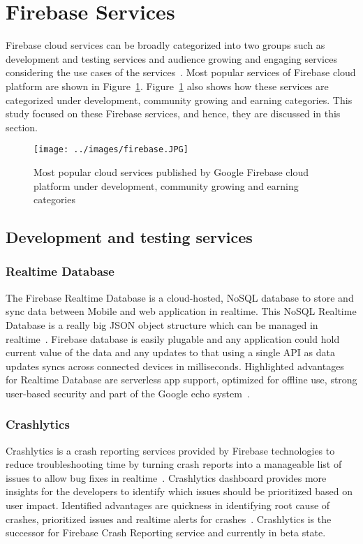 \section{Firebase Services}

Firebase cloud services can be broadly categorized into two groups
such as development and testing services and audience growing and
engaging services considering the use cases of the
services~\cite{hid-sp18-409-www-firebase-products}. Most popular
services of Firebase cloud platform are shown in
Figure~\ref{fig:firebase}. Figure~\ref{fig:firebase} also shows how
these services are categorized under development, community growing
and earning categories. This study focused on these Firebase services,
and hence, they are discussed in this section.

\begin{figure}[htb]
	\centering\texttt{[image: ../images/firebase.JPG]}
        \caption{
	Most popular cloud services published by Google Firebase cloud
	platform under development, community growing and earning
	categories~\cite{hid-sp18-409-www-firebase}}\label{fig:firebase}
\end{figure}

\subsection{Development and testing services}

\subsubsection{Realtime Database} The Firebase Realtime Database is a
cloud-hosted, NoSQL database to store and sync data between Mobile and
web application in realtime. This NoSQL Realtime Database is a really
big JSON object structure which can be managed in
realtime~\cite{hid-sp18-409-www-firebase-wikipedia,
  hid-sp18-409-www-firebase-products}. Firebase database is easily
plugable and any application could hold current value of the data and
any updates to that using a single API as data updates syncs across
connected devices in milliseconds. Highlighted advantages for Realtime
Database are serverless app support, optimized for offline use, strong
user-based security and part of the Google echo
system~\cite{hid-sp18-409-www-firebase-products}.

\subsubsection{Crashlytics} Crashlytics is a crash reporting services
provided by Firebase technologies to reduce troubleshooting time by
turning crash reports into a manageable list of issues to allow bug
fixes in
realtime~\cite{hid-sp18-409-www-firebase-products}. Crashlytics
dashboard provides more insights for the developers to identify which
issues should be prioritized based on user impact. Identified
advantages are quickness in identifying root cause of crashes,
prioritized issues and realtime alerts for
crashes~\cite{hid-sp18-409-www-firebase-products}. Crashlytics is the
successor for Firebase Crash Reporting service and currently in beta
state.

